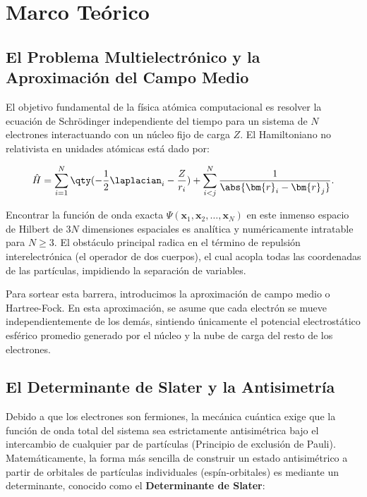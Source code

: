 \chapter{Marco Teórico}
\label{ch:marco-teorico}

\section{El Problema Multielectrónico y la Aproximación del Campo Medio}

El objetivo fundamental de la física atómica computacional es resolver la ecuación de Schrödinger independiente del tiempo para un sistema de \( N \) electrones interactuando con un núcleo fijo de carga \( Z \). El Hamiltoniano no relativista en unidades atómicas está dado por:

\begin{equation}
  \label{eq:hamiltonian-mb}
  \hat{H} = \sum_{i=1}^N \qty(-\frac{1}{2}\laplacian_i - \frac{Z}{r_i}) + \sum_{i<j}^N \frac{1}{\abs{\bm{r}_i-\bm{r}_j}}.
\end{equation}

Encontrar la función de onda exacta \( \Psi(\bm{x}_1, \bm{x}_2, \dots, \bm{x}_N) \) en este inmenso espacio de Hilbert de \( 3N \) dimensiones espaciales es analítica y numéricamente intratable para \( N \geq 3 \). El obstáculo principal radica en el término de repulsión interelectrónica (el operador de dos cuerpos), el cual acopla todas las coordenadas de las partículas, impidiendo la separación de variables. 

Para sortear esta barrera, introducimos la aproximación de campo medio o Hartree-Fock. En esta aproximación, se asume que cada electrón se mueve independientemente de los demás, sintiendo únicamente el potencial electrostático esférico promedio generado por el núcleo y la nube de carga del resto de los electrones. 

\section{El Determinante de Slater y la Antisimetría}

Debido a que los electrones son fermiones, la mecánica cuántica exige que la función de onda total del sistema sea estrictamente antisimétrica bajo el intercambio de cualquier par de partículas (Principio de exclusión de Pauli). Matemáticamente, la forma más sencilla de construir un estado antisimétrico a partir de orbitales de partículas individuales (espín-orbitales) es mediante un determinante, conocido como el \textbf{Determinante de Slater}:

